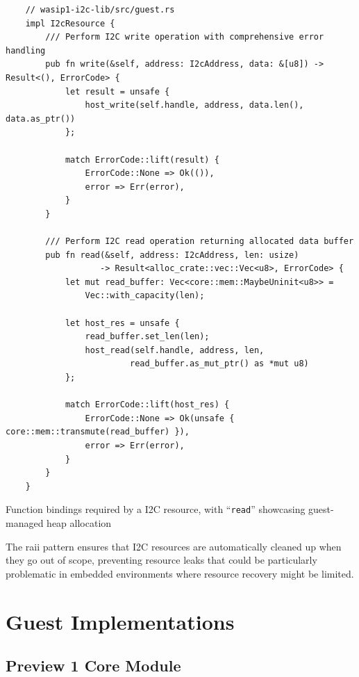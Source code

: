 \begin{listing}[H]
    \begin{verbatim}
    // wasip1-i2c-lib/src/guest.rs
    impl I2cResource {
        /// Perform I2C write operation with comprehensive error handling
        pub fn write(&self, address: I2cAddress, data: &[u8]) -> Result<(), ErrorCode> {
            let result = unsafe {
                host_write(self.handle, address, data.len(), data.as_ptr())
            };
            
            match ErrorCode::lift(result) {
                ErrorCode::None => Ok(()),
                error => Err(error),
            }
        }
    
        /// Perform I2C read operation returning allocated data buffer
        pub fn read(&self, address: I2cAddress, len: usize) 
                   -> Result<alloc_crate::vec::Vec<u8>, ErrorCode> {
            let mut read_buffer: Vec<core::mem::MaybeUninit<u8>> = 
                Vec::with_capacity(len);
    
            let host_res = unsafe {
                read_buffer.set_len(len);
                host_read(self.handle, address, len, 
                         read_buffer.as_mut_ptr() as *mut u8)
            };
    
            match ErrorCode::lift(host_res) {
                ErrorCode::None => Ok(unsafe { core::mem::transmute(read_buffer) }),
                error => Err(error),
            }
        }
    }
    \end{verbatim}
    \caption{Function bindings required by a I2C resource, with ``\texttt{read}'' showcasing guest-managed heap allocation}
    \label{lst:guest-resource-management}
\end{listing}

The \acrshort{raii} pattern ensures that I2C resources are automatically cleaned up when they go out of scope, preventing resource leaks that could be particularly problematic in embedded environments where resource recovery might be limited.

\section{Guest Implementations}
\label{sec:guest-implementations}

\subsection{Preview 1 Core Module}

